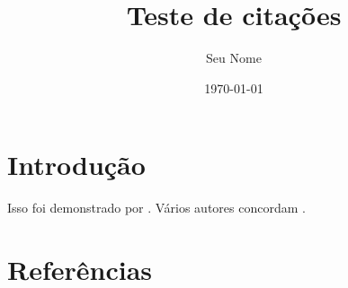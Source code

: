 \documentclass[11pt]{article}
\author{Seu Nome}
\date{\today}
\title{Teste de citações}
\begin{document}
\maketitle
\tableofcontents

\section{Introdução}
\label{sec:org3c3b4c1}

Isso foi demonstrado por \autocite{silva2020}.
Vários autores concordam \autocite{silva2020,souza2019}.
\section{Referências}
\label{sec:org1e7f24f}

\printbibliography
\end{document}

